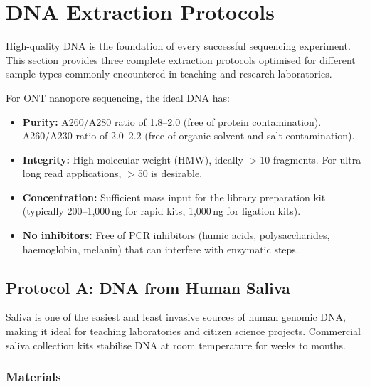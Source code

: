 \section{DNA Extraction Protocols}
\label{sec:protocols:extraction}

High-quality DNA is the foundation of every successful sequencing experiment. This section provides three complete extraction protocols optimised for different sample types commonly encountered in teaching and research laboratories.

\begin{keyconcept}[title={What Makes DNA ``High Quality'' for Nanopore Sequencing?}]
For \acrshort{ONT} nanopore sequencing, the ideal DNA has:
\begin{itemize}[nosep]
  \item \textbf{Purity:} A260/A280 ratio of 1.8--2.0 (free of protein contamination). A260/A230 ratio of 2.0--2.2 (free of organic solvent and salt contamination).
  \item \textbf{Integrity:} High molecular weight (HMW), ideally $>$10\kilobase{} fragments. For ultra-long read applications, $>$50\kilobase{} is desirable.
  \item \textbf{Concentration:} Sufficient mass input for the library preparation kit (typically 200--1,000\,ng for rapid kits, 1,000\,ng for ligation kits).
  \item \textbf{No inhibitors:} Free of \acrshort{PCR} inhibitors (humic acids, polysaccharides, haemoglobin, melanin) that can interfere with enzymatic steps.
\end{itemize}
\end{keyconcept}

\subsection{Protocol A: DNA from Human Saliva}
\label{subsec:protocols:saliva}

Saliva is one of the easiest and least invasive sources of human genomic DNA, making it ideal for teaching laboratories and citizen science projects. Commercial saliva collection kits stabilise DNA at room temperature for weeks to months.

\subsubsection{Materials}

